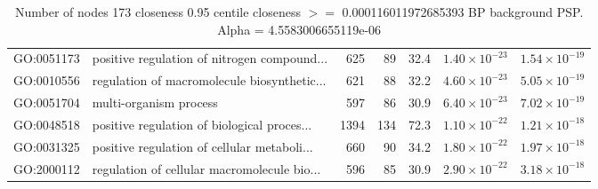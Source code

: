 \begin{table}[ht]
\begin{adjustbox}{max width=\textwidth}
\begin{tabular}{llrrrrr}
  GO:0051173 & positive regulation of nitrogen compound... & 625 & 89 & 32.4 & $1.40 \times 10^{-23}$ & $1.54 \times 10^{-19}$ \\ 
  GO:0010556 & regulation of macromolecule biosynthetic... & 621 & 88 & 32.2 & $4.60 \times 10^{-23}$ & $5.05 \times 10^{-19}$ \\ 
  GO:0051704 & multi-organism process & 597 & 86 & 30.9 & $6.40 \times 10^{-23}$ & $7.02 \times 10^{-19}$ \\ 
  GO:0048518 & positive regulation of biological proces... & 1394 & 134 & 72.3 & $1.10 \times 10^{-22}$ & $1.21 \times 10^{-18}$ \\ 
  GO:0031325 & positive regulation of cellular metaboli... & 660 & 90 & 34.2 & $1.80 \times 10^{-22}$ & $1.97 \times 10^{-18}$ \\ 
  GO:2000112 & regulation of cellular macromolecule bio... & 596 & 85 & 30.9 & $2.90 \times 10^{-22}$ & $3.18 \times 10^{-18}$ \\ 
   \hline
\end{tabular}
\end{adjustbox}
\caption{Number of nodes 173 closeness 0.95 centile  closeness $>=$ 0.000116011972685393 BP background PSP. Alpha = 4.5583006655119e-06} 
\label{tab:Number of nodes 173 closeness 0.95 centile  closeness $>=$ 0.000116011972685393 BP background PSP. Alpha = 4.5583006655119e-06}
\end{table}

